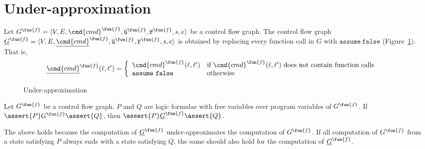 

\section{Under-approximation}\label{sec:under-approximation}

Let $G^\fun{f} = \langle V, E, \cmd{cmd}^\fun{f}, \overline{\texttt{u}}^\fun{f}, \overline{\texttt{r}}^\fun{f},s,e \rangle$ be a control flow graph.
The control flow graph $\underline{G}^\fun{f} = \langle V, E,
\underline{\cmd{cmd}}^\fun{f}, \overline{\texttt{u}}^\fun{f}, \overline{\texttt{r}}^\fun{f},s,e \rangle$ is obtained by replacing every function call in $G$ with $\mathtt{assume\ false}$
(Figure~\ref{figure:under-approximation}).
That is,
\begin{equation*}
  \underline{\cmd{cmd}}^\fun{f} (\ell, \ell') =
  \left\{
    \begin{array}{ll}
      \cmd{cmd}^\fun{f} (\ell, \ell') &
      \text{if } \cmd{cmd}^\fun{f} (\ell, \ell')
      \text{ does not contain function calls}\\
      \mathtt{assume\ false} &
      \text{otherwise}
    \end{array}
  \right.
\end{equation*}

\begin{figure}[t]
  \centering

  \caption{Under-approximation}
  \label{figure:under-approximation}
\end{figure}

\begin{proposition}
  Let $G^\fun{f}$ be a control flow graph. $P$ and $Q$ are logic formulae with
  free variables over program variables of $G^\fun{f}$. If $\assert{P}
  G^\fun{f} \assert{Q}$, then 
  $\assert{P} \underline{G}^\fun{f} \assert{Q}$.
\end{proposition}
The above holds because the computation of $\underline{G}^\fun{f}$ under-approximates the computation of $G^\fun{f}$.
If all computation of $G^\fun{f}$ from a state satisfying $P$ always ends with a state satisfying $Q$,
the same should also hold for the computation of $\underline{G}^\fun{f}$.
